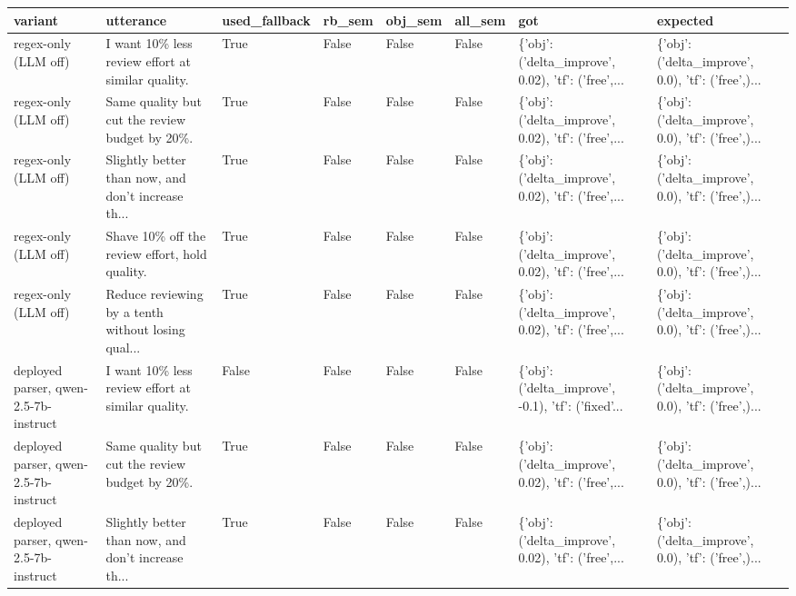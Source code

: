 \begin{tabular}{llllllll}
\toprule
                                          variant &                                          utterance &  used\_fallback &  rb\_sem &  obj\_sem &  all\_sem &                                                got &                                           expected \\
\midrule
                             regex-only (LLM off) &  I want 10\% less review effort at similar quality. &           True &   False &    False &    False & \{'obj': ('delta\_improve', 0.02), 'tf': ('free',... & \{'obj': ('delta\_improve', 0.0), 'tf': ('free',)... \\
                             regex-only (LLM off) &     Same quality but cut the review budget by 20\%. &           True &   False &    False &    False & \{'obj': ('delta\_improve', 0.02), 'tf': ('free',... & \{'obj': ('delta\_improve', 0.0), 'tf': ('free',)... \\
                             regex-only (LLM off) & Slightly better than now, and don't increase th... &           True &   False &    False &    False & \{'obj': ('delta\_improve', 0.02), 'tf': ('free',... & \{'obj': ('delta\_improve', 0.0), 'tf': ('free',)... \\
                             regex-only (LLM off) &     Shave 10\% off the review effort, hold quality. &           True &   False &    False &    False & \{'obj': ('delta\_improve', 0.02), 'tf': ('free',... & \{'obj': ('delta\_improve', 0.0), 'tf': ('free',)... \\
                             regex-only (LLM off) & Reduce reviewing by a tenth without losing qual... &           True &   False &    False &    False & \{'obj': ('delta\_improve', 0.02), 'tf': ('free',... & \{'obj': ('delta\_improve', 0.0), 'tf': ('free',)... \\
            deployed parser, qwen-2.5-7b-instruct &  I want 10\% less review effort at similar quality. &          False &   False &    False &    False & \{'obj': ('delta\_improve', -0.1), 'tf': ('fixed'... & \{'obj': ('delta\_improve', 0.0), 'tf': ('free',)... \\
            deployed parser, qwen-2.5-7b-instruct &     Same quality but cut the review budget by 20\%. &           True &   False &    False &    False & \{'obj': ('delta\_improve', 0.02), 'tf': ('free',... & \{'obj': ('delta\_improve', 0.0), 'tf': ('free',)... \\
            deployed parser, qwen-2.5-7b-instruct & Slightly better than now, and don't increase th... &           True &   False &    False &    False & \{'obj': ('delta\_improve', 0.02), 'tf': ('free',... & \{'obj': ('delta\_improve', 0.0), 'tf': ('free',)... \\

\end{tabular}
